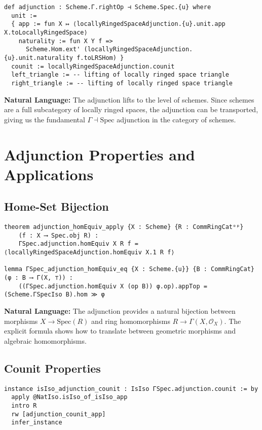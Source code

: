 \documentclass{article}
\theoremstyle{definition}
\begin{document}
\begin{lstlisting}
def adjunction : Scheme.Γ.rightOp ⊣ Scheme.Spec.{u} where
  unit := 
  { app := fun X ↦ ⟨locallyRingedSpaceAdjunction.{u}.unit.app X.toLocallyRingedSpace⟩
    naturality := fun X Y f => 
      Scheme.Hom.ext' (locallyRingedSpaceAdjunction.{u}.unit.naturality f.toLRSHom) }
  counit := locallyRingedSpaceAdjunction.counit
  left_triangle := -- lifting of locally ringed space triangle
  right_triangle := -- lifting of locally ringed space triangle
\end{lstlisting}

\textbf{Natural Language:} The adjunction lifts to the level of schemes. Since schemes are a full subcategory of locally ringed spaces, the adjunction can be transported, giving us the fundamental $\Gamma \dashv \mathrm{Spec}$ adjunction in the category of schemes.

\section{Adjunction Properties and Applications}

\subsection{Home-Set Bijection}

\begin{lstlisting}
theorem adjunction_homEquiv_apply {X : Scheme} {R : CommRingCatᵒᵖ}
    (f : X ⟶ Spec.obj R) :
    ΓSpec.adjunction.homEquiv X R f = ⟨locallyRingedSpaceAdjunction.homEquiv X.1 R f⟩

lemma ΓSpec_adjunction_homEquiv_eq {X : Scheme.{u}} {B : CommRingCat} (φ : B ⟶ Γ(X, ⊤)) :
    ((ΓSpec.adjunction.homEquiv X (op B)) φ.op).appTop = (Scheme.ΓSpecIso B).hom ≫ φ
\end{lstlisting}

\textbf{Natural Language:} The adjunction provides a natural bijection between morphisms $X \to \mathrm{Spec}(R)$ and ring homomorphisms $R \to \Gamma(X, \mathcal{O}_X)$. The explicit formula shows how to translate between geometric morphisms and algebraic homomorphisms.

\subsection{Counit Properties}

\begin{lstlisting}
instance isIso_adjunction_counit : IsIso ΓSpec.adjunction.counit := by
  apply @NatIso.isIso_of_isIso_app
  intro R
  rw [adjunction_counit_app]
  infer_instance
\end{lstlisting}
\end{document}
